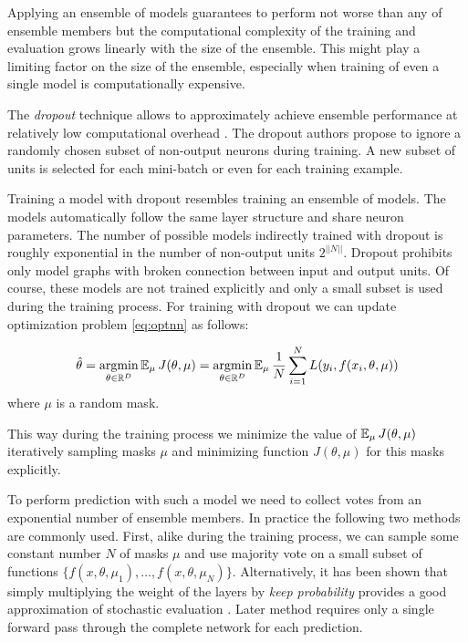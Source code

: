 Applying an ensemble of models guarantees to perform not worse than any of ensemble members but the computational complexity of the training and evaluation grows linearly with the size of the ensemble. This might play a limiting factor on the size of the ensemble, especially when training of even a single model is computationally expensive.

The \textit{dropout} technique allows to approximately achieve ensemble performance at relatively low computational overhead \cite{Srivastava2014}.
The dropout authors propose to ignore a randomly chosen subset of non-output neurons during training. A new subset of units is selected for each mini-batch or even for each training example.

Training a model with dropout resembles training an ensemble of models. The models automatically follow the same layer structure and share neuron parameters. The number of possible models indirectly trained with dropout is roughly exponential in the number of non-output units $2^{||N||}$. Dropout prohibits only model graphs with broken connection between input and output units. Of course, these models are not trained explicitly and only a small subset is used during the training process. For training with dropout we can update optimization problem \ref{eq:optnn} as follows:

\begin{equation}\label{eq:optnndo}
  \hat{\theta} = \operatorname*{argmin}_{\theta \in \Bbb{R}^D} \operatorname{\mathbb{E}}_\mu J(\theta, \mu) = \operatorname*{argmin}_{\theta \in \Bbb{R}^D} \operatorname{\mathbb{E}}_\mu \frac{1}{N} \sum_{i=1}^{N} L(y_i, f(x_i, \theta, \mu))
\end{equation}
where $\mu$ is a random mask.

This way during the training process we minimize the value of $\operatorname{\mathbb{E}}_\mu J(\theta, \mu)$ iteratively sampling masks $\mu$ and minimizing function $J(\theta, \mu)$ for this masks explicitly.

To perform prediction with such a model we need to collect votes from an exponential number of ensemble members.
In practice the following two methods are commonly used. First, alike during the training process, we can sample some constant number $N$ of masks $\mu$ and use majority vote on a small subset of functions $\{f(x, \theta, \mu_1), \ldots, f(x, \theta, \mu_N)\}$. Alternatively, it has been shown that simply multiplying the weight of the layers by \textit{keep probability} provides a good approximation of stochastic evaluation \cite{Srivastava2014}. Later method requires only a single forward pass through the complete network for each prediction.

